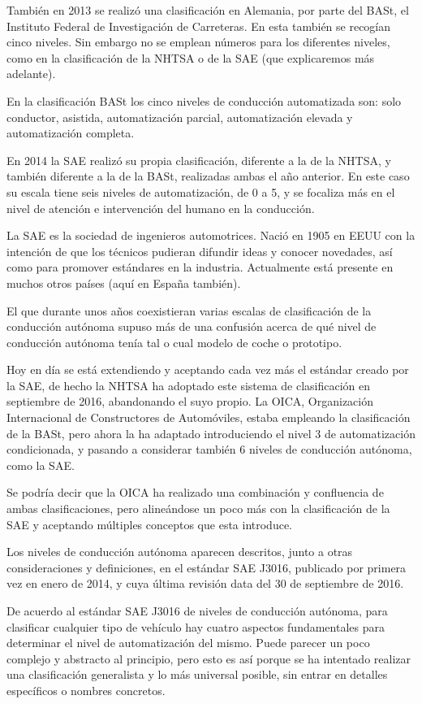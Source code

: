 \documentclass{pclass}
\begin{document}
También en 2013 se realizó una clasificación en Alemania, por parte del BASt, el Instituto Federal de Investigación de Carreteras. En esta también se recogían cinco niveles. Sin embargo no se emplean números para los diferentes niveles, como en la clasificación de la NHTSA o de la SAE (que explicaremos más adelante).

En la clasificación BASt los cinco niveles de conducción automatizada son: solo conductor, asistida, automatización parcial, automatización elevada y automatización completa.

En 2014 la SAE realizó su propia clasificación, diferente a la de la NHTSA, y también diferente a la de la BASt, realizadas ambas el año anterior. En este caso su escala tiene seis niveles de automatización, de 0 a 5, y se focaliza más en el nivel de atención e intervención del humano en la conducción.

La SAE es la sociedad de ingenieros automotrices. Nació en 1905 en EEUU con la intención de que los técnicos pudieran difundir ideas y conocer novedades, así como para promover estándares en la industria. Actualmente está presente en muchos otros países (aquí en España también).

El que durante unos años coexistieran varias escalas de clasificación de la conducción autónoma supuso más de una confusión acerca de qué nivel de conducción autónoma tenía tal o cual modelo de coche o prototipo.

Hoy en día se está extendiendo y aceptando cada vez más el estándar creado por la SAE, de hecho la NHTSA ha adoptado este sistema de clasificación en septiembre de 2016, abandonando el suyo propio. La OICA, Organización Internacional de Constructores de Automóviles, estaba empleando la clasificación de la BASt, pero ahora la ha adaptado introduciendo el nivel 3 de automatización condicionada, y pasando a considerar también 6 niveles de conducción autónoma, como la SAE.

Se podría decir que la OICA ha realizado una combinación y confluencia de ambas clasificaciones, pero alineándose un poco más con la clasificación de la SAE y aceptando múltiples conceptos que esta introduce.

Los niveles de conducción autónoma aparecen descritos, junto a otras consideraciones y definiciones, en el estándar SAE J3016, publicado por primera vez en enero de 2014, y cuya última revisión data del 30 de septiembre de 2016.

De acuerdo al estándar SAE J3016 de niveles de conducción autónoma, para clasificar cualquier tipo de vehículo hay cuatro aspectos fundamentales para determinar el nivel de automatización del mismo. Puede parecer un poco complejo y abstracto al principio, pero esto es así porque se ha intentado realizar una clasificación generalista y lo más universal posible, sin entrar en detalles específicos o nombres concretos.
\end{document}
